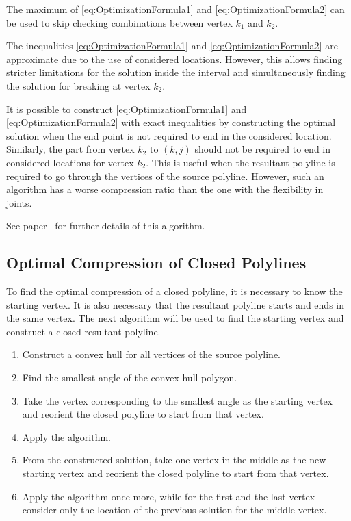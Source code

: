 \documentclass[conference]{IEEEtran}
\begin{document}
The maximum of \eqref{eq:OptimizationFormula1} and \eqref{eq:OptimizationFormula2} can be used to skip checking combinations between vertex $k_1$ and $k_2$.

The inequalities \eqref{eq:OptimizationFormula1} and \eqref{eq:OptimizationFormula2} are approximate due to the use of considered locations. However, this allows finding stricter limitations for the solution inside the interval and simultaneously finding the solution for breaking at vertex $k_2$.

It is possible to construct \eqref{eq:OptimizationFormula1} and \eqref{eq:OptimizationFormula2} with exact inequalities by constructing the optimal solution when the end point is not required to end in the considered location. Similarly, the part from vertex $k_2$ to $\left( k, j \right)$ should not be required to end in considered locations for vertex $k_2$. This is useful when the resultant polyline is required to go through the vertices of the source polyline. However, such an algorithm has a worse compression ratio than the one with the flexibility in joints.

See paper~\cite{PolylineGeneralizationCombinatorical} for further details of this algorithm.

\subsection{Optimal Compression of Closed Polylines}

To find the optimal compression of a closed polyline, it is necessary to know the starting vertex. It is also necessary that the resultant polyline starts and ends in the same vertex. The next algorithm will be used to find the starting vertex and construct a closed resultant polyline.
\begin{enumerate}[label={\arabic*.}, ref={\arabic*}]
  \item \label{enum:ConvexHull} Construct a convex hull for all vertices of the source polyline.
  \item \label{enum:SmallesAngle}  Find the smallest angle of the convex hull polygon.
  \item \label{enum:Reorient}  Take the vertex corresponding to the smallest angle as the starting vertex and reorient the closed polyline to start from that vertex.
  \item Apply the algorithm.
  \item \label{enum:ConstructFirstSolution} From the constructed solution, take one vertex in the middle as the new starting vertex and reorient the closed polyline to start from that vertex.
  \item Apply the algorithm once more, while for the first and the last vertex consider only the location of the previous solution for the middle vertex.
\end{enumerate}
\end{document}
